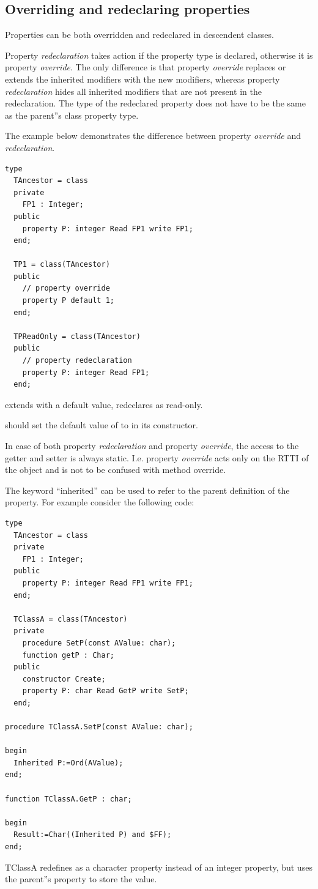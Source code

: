 \subsection{Overriding and redeclaring properties}
Properties can be both overridden and redeclared in descendent classes.

Property {\em redeclaration} takes action if the property type is declared, otherwise it is property {\em override}.
The only difference is that property {\em override} replaces or extends the inherited modifiers with the new modifiers,
whereas property {\em redeclaration} hides all inherited modifiers that are not present in the redeclaration.
The type of the redeclared property does not have to be the same as the parent''s class property type.

The example below demonstrates the difference between property {\em override} and {\em redeclaration}.
\begin{verbatim}
type
  TAncestor = class
  private
    FP1 : Integer;
  public
    property P: integer Read FP1 write FP1;
  end;

  TP1 = class(TAncestor)
  public
    // property override
    property P default 1;
  end;

  TPReadOnly = class(TAncestor)
  public
    // property redeclaration
    property P: integer Read FP1;
  end;
\end{verbatim}

 extends  with a default value,  redeclares  as read-only.

\begin{remark}
 should set the default value of  to  in its constructor.
\end{remark}

In case of both property {\em redeclaration} and property {\em override}, the access
to the getter and setter is always static.
I.e. property {\em override} acts only on the RTTI of the object and is not to be confused with method override.

The keyword ``inherited''  can be used to refer to the parent
definition of the property. For example consider the following code:
\begin{verbatim}
type
  TAncestor = class
  private
    FP1 : Integer;
  public
    property P: integer Read FP1 write FP1;
  end;

  TClassA = class(TAncestor)
  private
    procedure SetP(const AValue: char);
    function getP : Char;
  public
    constructor Create;
    property P: char Read GetP write SetP;
  end;

procedure TClassA.SetP(const AValue: char);

begin
  Inherited P:=Ord(AValue);
end;

function TClassA.GetP : char;

begin
  Result:=Char((Inherited P) and $FF);
end;
\end{verbatim}
TClassA redefines  as a character property instead of an integer
property, but uses the parent''s  property to store the value.


